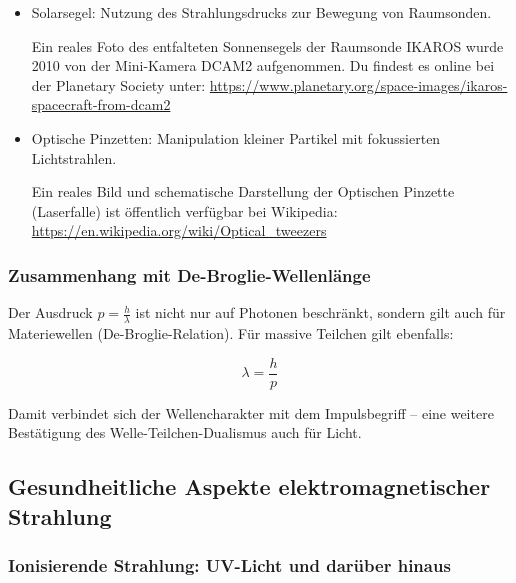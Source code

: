 \begin{itemize}
	\item Solarsegel: Nutzung des Strahlungsdrucks zur Bewegung von Raumsonden.
	\begin{tcolorbox}[hinweisbox, title=Reales Bildmaterial]
		\label{keybox:RealesBildmaterial}
		Ein reales Foto des entfalteten Sonnensegels der Raumsonde IKAROS wurde 2010 von der Mini-Kamera DCAM2 aufgenommen.  
		Du findest es online bei der Planetary Society unter:  
		\url{https://www.planetary.org/space-images/ikaros-spacecraft-from-dcam2}
	\end{tcolorbox}
	\item Optische Pinzetten: Manipulation kleiner Partikel mit fokussierten Lichtstrahlen.
	\begin{tcolorbox}[hinweisbox, title=Reales Bildmaterial zur optischen Pinzette]
		\label{box:Manipulation kleiner Partikel}
		Ein reales Bild und schematische Darstellung der Optischen Pinzette (Laserfalle) ist öffentlich verfügbar bei Wikipedia:  
		\url{https://en.wikipedia.org/wiki/Optical_tweezers}
	\end{tcolorbox}
\end{itemize}

\subsubsection{Zusammenhang mit De-Broglie-Wellenlänge}

Der Ausdruck \( p = \frac{h}{\lambda} \) ist nicht nur auf Photonen beschränkt, sondern gilt auch für Materiewellen (De-Broglie-Relation). Für massive Teilchen gilt ebenfalls:

\[
\lambda = \frac{h}{p}
\]

Damit verbindet sich der Wellencharakter mit dem Impulsbegriff – eine weitere Bestätigung des Welle-Teilchen-Dualismus auch für Licht.

\subsection{Gesundheitliche Aspekte elektromagnetischer \newline Strahlung}

\subsubsection{Ionisierende Strahlung: UV-Licht und darüber hinaus}

